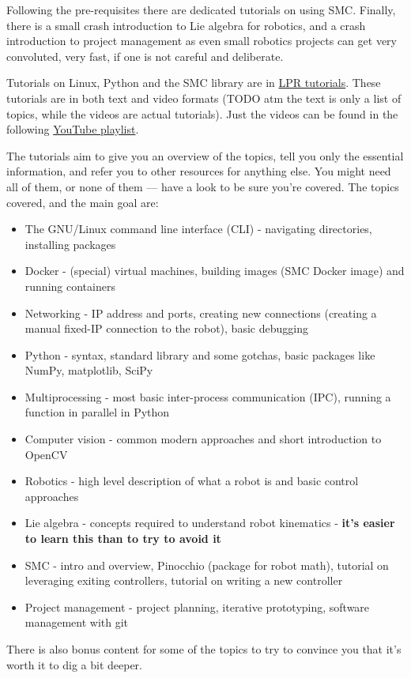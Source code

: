 Following the pre-requisites there are dedicated
tutorials on using SMC. Finally, 
there is a small crash introduction to Lie algebra for robotics,
and a crash introduction to project management as
even small robotics projects can get very convoluted,
very fast, if one is not careful and deliberate.

Tutorials on Linux, Python and the SMC library 
are in 
\href{https://gitlab.control.lth.se/marko-g/LPR-tutorials}{LPR tutorials}.
These tutorials are in both text and video formats 
(TODO atm the text is only a list of topics, while
the videos are actual tutorials).
Just the videos can be found in the following 
\href{https://www.youtube.com/playlist?list=PLKOlTxWSIaGWsaJwz6oKtgGB1Ukv_RIeP}{YouTube playlist}.

The tutorials aim to give you an overview of the topics,
tell you only the essential information, and refer you
to other resources for anything else. You might need
all of them, or none of them --- have a look to be sure
you're covered.
The topics covered, and the main goal are:
\begin{itemize}
		\item The GNU/Linux command line interface (CLI) - 
				navigating directories, installing packages
		\item Docker - (special) virtual machines,
				building images (SMC Docker image) and running
				containers
		\item Networking - IP address and ports, creating
				new connections (creating a manual fixed-IP connection
				to the robot), basic debugging
		\item Python - syntax, standard library and some gotchas,
				basic packages like NumPy, matplotlib, SciPy
		\item Multiprocessing - most basic inter-process communication
				(IPC), running a function in parallel in Python
		\item Computer vision - common modern approaches
				and short introduction to OpenCV
		\item Robotics - high level description
				of what a robot is and basic control 
				approaches
		\item Lie algebra - concepts required to understand
				robot kinematics - \textbf{it's easier
				to learn this than to try to avoid it}
		\item SMC - intro and overview, Pinocchio
				(package for robot math),
				tutorial on leveraging exiting controllers,
				tutorial on writing a new controller
		\item Project management - project planning,
				iterative prototyping, software management with git
\end{itemize}
There is also bonus content for some of the topics
to try to convince you that it's worth it to dig
a bit deeper.

